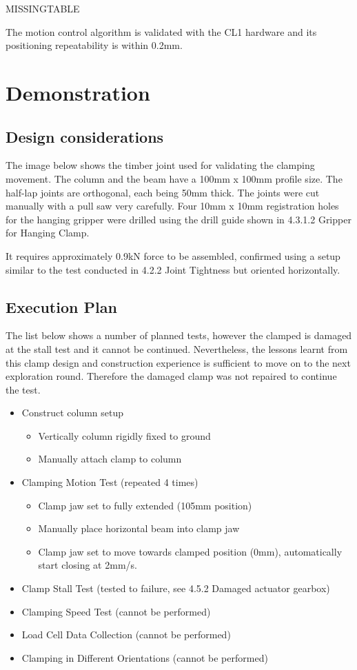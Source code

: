 MISSINGTABLE

The motion control algorithm is validated with the CL1 hardware and its positioning repeatability is within 0.2mm.

\section{Demonstration}
\subsection{Design considerations}
The image below shows the timber joint used for validating the clamping movement. The column and the beam have a 100mm x 100mm profile size. The half-lap joints are orthogonal, each being 50mm thick. The joints were cut manually with a pull saw very carefully. Four 10mm x 10mm registration holes for the hanging gripper were drilled using the drill guide shown in 4.3.1.2 Gripper for Hanging Clamp.

It requires approximately 0.9kN force to be assembled, confirmed using a setup similar to the test conducted in 4.2.2 Joint Tightness but oriented horizontally.
\subsection{Execution Plan}
The list below shows a number of planned tests, however the clamped is damaged at the stall test and it cannot be continued. Nevertheless, the lessons learnt from this clamp design and construction experience is sufficient to move on to the next exploration round. Therefore the damaged clamp was not repaired to continue the test.
\begin{itemize}
    \item Construct column setup
    \begin{itemize}
        \item Vertically column rigidly fixed to ground
        \item Manually attach clamp to column
    \end{itemize}
    \item Clamping Motion Test (repeated 4 times)
    \begin{itemize}
        \item Clamp jaw set to fully extended (105mm position)
        \item Manually place horizontal beam into clamp jaw 
        \item Clamp jaw set to move towards clamped position (0mm), automatically start closing at 2mm/s.
    \end{itemize}
    \item Clamp Stall Test (tested to failure, see 4.5.2 Damaged actuator gearbox)
    \item Clamping Speed Test (cannot be performed)
    \item Load Cell Data Collection (cannot be performed)
    \item Clamping in Different Orientations (cannot be performed)
\end{itemize}

